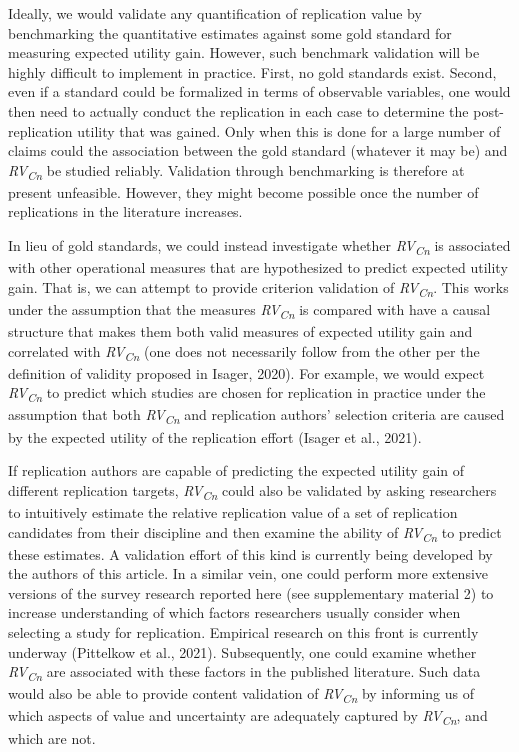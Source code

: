 \documentclass[
  english,
  man,floatsintext]{apa6}
\begin{document}
Ideally, we would validate any quantification of replication value by benchmarking the quantitative estimates against some gold standard for measuring expected utility gain. However, such benchmark validation will be highly difficult to implement in practice. First, no gold standards exist. Second, even if a standard could be formalized in terms of observable variables, one would then need to actually conduct the replication in each case to determine the post-replication utility that was gained. Only when this is done for a large number of claims could the association between the gold standard (whatever it may be) and \emph{RV\textsubscript{Cn}} be studied reliably. Validation through benchmarking is therefore at present unfeasible. However, they might become possible once the number of replications in the literature increases.

In lieu of gold standards, we could instead investigate whether \emph{RV\textsubscript{Cn}} is associated with other operational measures that are hypothesized to predict expected utility gain. That is, we can attempt to provide criterion validation of \emph{RV\textsubscript{Cn}}. This works under the assumption that the measures \emph{RV\textsubscript{Cn}} is compared with have a causal structure that makes them both valid measures of expected utility gain and correlated with \emph{RV\textsubscript{Cn}} (one does not necessarily follow from the other per the definition of validity proposed in Isager, 2020). For example, we would expect \emph{RV\textsubscript{Cn}} to predict which studies are chosen for replication in practice under the assumption that both \emph{RV\textsubscript{Cn}} and replication authors' selection criteria are caused by the expected utility of the replication effort (Isager et al., 2021).

If replication authors are capable of predicting the expected utility gain of different replication targets, \emph{RV\textsubscript{Cn}} could also be validated by asking researchers to intuitively estimate the relative replication value of a set of replication candidates from their discipline and then examine the ability of \emph{RV\textsubscript{Cn}} to predict these estimates. A validation effort of this kind is currently being developed by the authors of this article. In a similar vein, one could perform more extensive versions of the survey research reported here (see supplementary material 2) to increase understanding of which factors researchers usually consider when selecting a study for replication. Empirical research on this front is currently underway (Pittelkow et al., 2021). Subsequently, one could examine whether \emph{RV\textsubscript{Cn}} are associated with these factors in the published literature. Such data would also be able to provide content validation of \emph{RV\textsubscript{Cn}} by informing us of which aspects of value and uncertainty are adequately captured by \emph{RV\textsubscript{Cn}}, and which are not.
\end{document}
